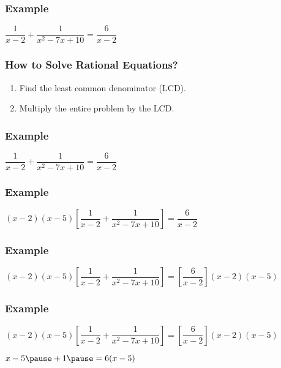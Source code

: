 \documentclass[14pt]{beamer}
\begin{document}
   \begin{frame}
   	\frametitle{Example}
   	$ \dfrac{1}{x - 2} + \dfrac{1}{x^2 - 7x + 10} = \dfrac{6}{x - 2} $
   	
   \end{frame}

    \begin{frame}
    	\frametitle{How to Solve Rational Equations?}
    	\begin{enumerate}
    		\item Find the least common denominator (LCD).
    		\item Multiply the entire problem by the LCD.
    	\end{enumerate}
    \end{frame}

    \begin{frame}
    	\frametitle{Example}
    	$ \dfrac{1}{x - 2} + \dfrac{1}{x^2 - 7x + 10} = \dfrac{6}{x - 2} $
    \end{frame}

   \begin{frame}
   	\frametitle{Example}
   	$ (x - 2 )(x - 5)\left[\dfrac{1}{x - 2} + \dfrac{1}{x^2 - 7x + 10}\right] = \dfrac{6}{x - 2} $
   \end{frame}

    \begin{frame}
    	\frametitle{Example}
    	$ (x - 2 )(x - 5) \left[\dfrac{1}{x - 2} + \dfrac{1}{x^2 - 7x + 10} \right] = \left[\dfrac{6}{x - 2}\right] (x - 2) ( x - 5 ) $
    \end{frame}

     \begin{frame}
    	\frametitle{Example}
    	$ (x - 2 )(x - 5) \left[\dfrac{1}{x - 2} + \dfrac{1}{x^2 - 7x + 10} \right] = \left[\dfrac{6}{x - 2}\right] (x - 2) ( x - 5 ) $
    	
    	\vspace{1em} $ x - 5 \pause + 1 \pause = 6 (x - 5) $
    \end{frame}
\end{document}
